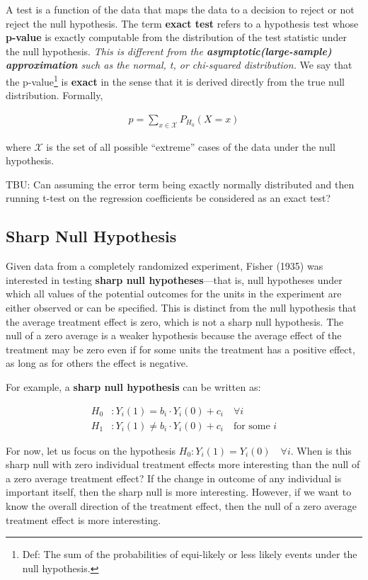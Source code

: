 A test is a function of the data that maps the data to a decision to reject or not reject the null hypothesis.
The term \textbf{exact test} refers to a hypothesis test whose \textbf{p-value} is exactly computable from the distribution of the test statistic under the null hypothesis.
\textit{This is different from the \textbf{asymptotic(large-sample) approximation} such as the normal, t, or chi-squared distribution.}
We say that the p-value\footnote{Def: The sum of the probabilities of equi-likely or less likely events under the null hypothesis.} is \textbf{exact} in the sense that it is derived directly from the true null distribution. Formally,

\begin{align}
    p = \sum_{x\in \mathcal{X}} P_{H_0}(X=x)
\end{align} 

where $\mathcal{X}$ is the set of all possible ``extreme'' cases of the data under the null hypothesis.


{\color{blue}

TBU: Can assuming the error term being exactly normally distributed and then running t-test on the regression coefficients be considered as an exact test?
}


\subsection{Sharp Null Hypothesis}

Given data from a completely randomized experiment, Fisher (1935) was interested in testing \textbf{sharp null hypotheses}—that is, null hypotheses under
which all values of the potential outcomes for the units in the experiment are either observed or can be specified.
This is distinct from the null hypothesis that the average treatment effect is zero, which is not a sharp null hypothesis.
The null of a zero average is a weaker hypothesis because the average effect of the treatment may be zero even if for some units the treatment has a positive effect, as long as for others the effect is negative.

For example, a \textbf{sharp null hypothesis} can be written as:

\begin{align*}
    H_0&: Y_i(1) = b_i\cdot Y_i(0) + c_i \quad \forall i\\
    H_1&: Y_i(1) \neq b_i\cdot Y_i(0) + c_i \quad \text{for some } i
\end{align*}

For now, let us focus on the hypothesis $H_0: Y_i(1) = Y_i(0) \quad \forall i$. When is this sharp null with zero individual treatment effects more interesting than the null of a zero average treatment effect? If the change in outcome of any individual is important itself, then the sharp null is more interesting.
However, if we want to know the overall direction of the treatment effect, then the null of a zero average treatment effect is more interesting.

